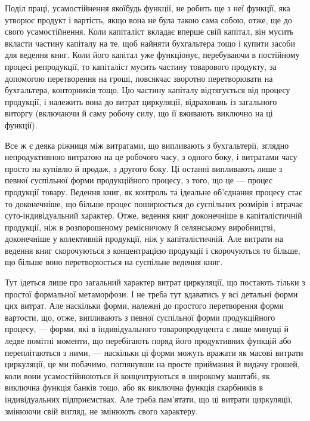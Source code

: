 Поділ праці, усамостійнення якоїбудь функції, не робить ще з неї
функції, яка утворює продукт і вартість, якщо вона не була такою сама
собою, отже, ще до свого усамостійнення. Коли капіталіст вкладає
вперше свій капітал, він мусить вкласти частину капіталу на те, щоб
найняти бухгальтера тощо і купити засоби для ведення книг. Коли його
капітал уже функціонує, перебуваючи в постійному процесі репродукції,
то капіталіст мусить частину товарового продукту, за допомогою перетворення
на гроші, повсякчас зворотно перетворювати на бухгальтера,
конторників тощо. Цю частину капіталу відтягується від процесу продукції,
і належить вона до витрат циркуляції, відраховань із загального
виторгу (включаючи й саму робочу силу, що її вживають виключно на
ці функції).

Все ж є деяка ріжниця між витратами, що випливають з бухгальтерії,
зглядно непродуктивною витратою на це робочого часу, з одного боку, і витратами
часу просто на купівлю й продаж, з другого боку. Ці останні випливають
лише з певної суспільної форми продукційного процесу, з того,
що це — процес продукції товару. Ведення книг, як контроль та ідеальне
об’єднання процесу стає то доконечніше, що більше процес поширюється
до суспільних розмірів і втрачає суто-індивідуальний характер.
Отже, ведення книг доконечніше в капіталістичній продукції, ніж
в розпорошеному ремісничому й селянському виробництві, доконечніше
у колективній продукції, ніж у капіталістичній. Але витрати на ведення
книг скорочуються з концентрацією продукції і скорочуються то більше,
що більше воно перетворюється на суспільне ведення книг.

Тут ідеться лише про загальний характер витрат циркуляції, що постають тільки з простої формальної
метаморфози. І не треба тут вдаватись у всі детальні форми цих витрат. Але наскільки форми, належні
до простого перетворення форми вартости, що, отже, випливають з певної суспільної форми
продукційного процесу, — форми, які в індивідуального товаропродуцента є лише минущі й ледве помітні
моменти, що перебігають поряд його продуктивних функцій або переплітаються з ними, — наскільки ці
форми можуть вражати як масові витрати циркуляції, це ми побачимо, поглянувши на просте приймання й
видачу грошей, коли вони усамостійнюються й концентруються в широкому маштабі, як виключна функція
банків тощо, або як виключна функція скарбників в індивідуальних підприємствах. Але треба пам’ятати,
що ці витрати циркуляції, змінюючи свій вигляд, не змінюють свого характеру.


